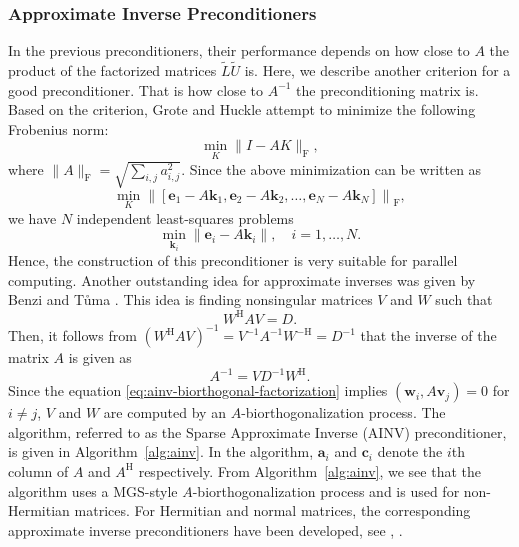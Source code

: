 \subsubsection{{Approximate Inverse Preconditioners}}\label{subsec:approximate-inverse-preconditioners}
{In the previous preconditioners, their performance depends on how close to $A$ the product of the factorized matrices $\widetilde L\widetilde U$ is. Here, we describe another criterion for a good preconditioner. That is how close to $A^{-1}$ the preconditioning matrix is. Based on the criterion, Grote and Huckle  attempt to minimize the following Frobenius norm:}
\[\min_K\|I-AK\|_{\mathrm F},\]
{where $\|A\|_{\mathrm F}=\sqrt{\sum_{i,j}a_{i,j}^2}$. Since the above minimization can be written as}
\[\min_K\left\|[\bm e_1-A\bm k_1,\bm e_2-A\bm k_2,\ldots,\bm e_N-A\bm k_N]\right\|_{\mathrm F},\]
{we have $N$ independent least-squares problems}
\[\min_{\bm k_i}\|\bm e_i-A\bm k_i\|,\quad i=1,\ldots,N.\]
{Hence, the construction of this preconditioner is very suitable for parallel computing.}
{Another outstanding idea for approximate inverses was given by Benzi and Tůma . This idea is finding nonsingular matrices $V$ and $W$ such that}
\begin{equation}\label{eq:ainv-biorthogonal-factorization}W^{\mathrm H}AV=D.\end{equation}
{Then, it follows from $(W^{\mathrm H}AV)^{-1}=V^{-1}A^{-1}W^{-\mathrm H}=D^{-1}$ that the inverse of the matrix $A$ is given as}
\[A^{-1}=VD^{-1}W^{\mathrm H}.\]
{Since the equation \eqref{eq:ainv-biorthogonal-factorization} implies $(\bm w_i,A\bm v_j)=0$ for $i\ne j$, $V$ and $W$ are computed by an $A$-biorthogonalization process. The algorithm, referred to as the Sparse Approximate Inverse (AINV) preconditioner, is given in Algorithm\ \ref{alg:ainv}. In the algorithm, $\bm a_i$ and $\bm c_i$ denote the $i$th column of $A$ and $A^{\mathrm H}$ respectively. From Algorithm\ \ref{alg:ainv}, we see that the algorithm uses a MGS-style $A$-biorthogonalization process and is used for non-Hermitian matrices. For Hermitian and normal matrices, the corresponding approximate inverse preconditioners have been developed, see , .}
